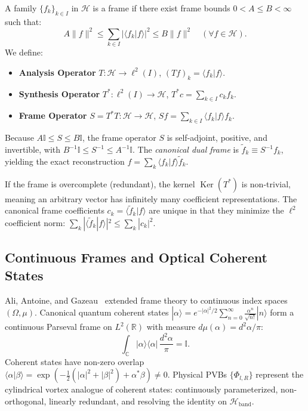 \documentclass{optica-article}
\begin{document}
A family $\{f_k\}_{k \in I}$ in $\mathcal{H}$ is a frame if there exist frame bounds $0 < A \le B < \infty$ such that:
\begin{equation}
A \|f\|^2 \le \sum_{k \in I} |\langle f_k | f \rangle|^2 \le B \|f\|^2 \quad (\forall f \in \mathcal{H}).
\end{equation}
We define:
\begin{itemize}
    \item \textbf{Analysis Operator} $T: \mathcal{H} \to \ell^2(I)$, $(T f)_k = \langle f_k | f \rangle$.
    \item \textbf{Synthesis Operator} $T^*: \ell^2(I) \to \mathcal{H}$, $T^* c = \sum_{k \in I} c_k f_k$.
    \item \textbf{Frame Operator} $S = T^* T: \mathcal{H} \to \mathcal{H}$, $S f = \sum_{k \in I} \langle f_k | f \rangle f_k$.
\end{itemize}
Because $A \mathbb{I} \le S \le B \mathbb{I}$, the frame operator $S$ is self-adjoint, positive, and invertible, with $B^{-1} \mathbb{I} \le S^{-1} \le A^{-1} \mathbb{I}$. The \emph{canonical dual frame} is $\widetilde{f}_k \equiv S^{-1} f_k$, yielding the exact reconstruction $f = \sum_k \langle f_k | f \rangle \widetilde{f}_k$.

If the frame is overcomplete (redundant), the kernel $\operatorname{Ker}(T^*)$ is non-trivial, meaning an arbitrary vector has infinitely many coefficient representations. The canonical frame coefficients $c_k = \langle \widetilde{f}_k | f \rangle$ are unique in that they minimize the $\ell^2$ coefficient norm: $\sum_k |\langle \widetilde{f}_k | f \rangle|^2 \le \sum_k |c_k|^2$.

\subsection{Continuous Frames and Optical Coherent States}

Ali, Antoine, and Gazeau~\cite{Ali1993,Gazeau2009} extended frame theory to continuous index spaces $(\Omega, \mu)$. Canonical quantum coherent states $|\alpha\rangle = e^{-|\alpha|^2/2} \sum_{n=0}^\infty \frac{\alpha^n}{\sqrt{n!}} |n\rangle$ form a continuous Parseval frame on $L^2(\mathbb{R})$ with measure $d\mu(\alpha) = d^2\alpha / \pi$:
\begin{equation}
\int_{\mathbb{C}} |\alpha\rangle \langle \alpha| \, \frac{d^2\alpha}{\pi} = \mathbb{I}.
\end{equation}
Coherent states have non-zero overlap $\langle \alpha | \beta \rangle = \exp(-\frac{1}{2}(|\alpha|^2 + |\beta|^2) + \alpha^* \beta) \neq 0$. Physical PVBs $\{\Phi_{l, R}\}$ represent the cylindrical vortex analogue of coherent states: continuously parameterized, non-orthogonal, linearly redundant, and resolving the identity on $\mathcal{H}_{\text{band}}$.
\end{document}
